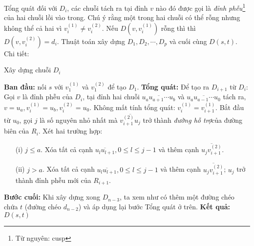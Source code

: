 Tổng quát đối với $D_i$, các chuỗi tách ra tại đỉnh $v$ nào đó được gọi là \textit{đỉnh phễu}\footnote{Từ nguyên: cusp} của hai chuỗi lồi vào trong. Chú ý rằng một trong hai chuỗi có thể rỗng nhưng không thể cả hai vì $v^{(1)}_i \ne v^{(2)}_i$. Nếu $D\left(v, v^{(1)}_i\right)$ rỗng thì thì $D\left(v,v^{(2)}_i\right) = d_i$.
\newpage
Thuật toán xây dựng $D_1,D_2,\cdots,D_p$ và cuối cùng $D\left(s,t\right)$. Chi tiết:

\begin{algorithm}
\caption{Xây dựng chuỗi $D_i$}
\begin{algorithmic}
    \STATE \textbf{Ban đầu:} nối $s$ với $v^{(1)}_1$ và $v^{(2)}_1$ để tạo $D_1$.
    \STATE \textbf{Tổng quát:} Để tạo ra $D_{i+1}$ từ $D_i$:
    \STATE Gọi $v$ là đỉnh phễu của $D_i$, tại đỉnh hai chuỗi $\overline{u_a u_{a+1} \cdots u_b}$ và $\overline{u_a u_{a-1} \cdots u_0}$ tách ra, $v = u_a, v^{(1)}_i = u_b, v^{(2)}_i = u_0$. Không mất tính tổng quát: $v^{(1)}_i = v^{(1)}_{i+1}$. Bắt đầu từ $u_0$, gọi $j$ là số nguyên nhỏ nhất mà $\overline{v^{(2)}_{i+1} u_j}$ trở thành \textit{đường hỗ trợ}\footnotemark của đường biên của $R_i$. Xét hai trường hợp:
    \begin{itemize}
        \item [(i)] $j \leq a$. Xóa tất cả cạnh $\overline{u_l u_{l+1}}, 0 \leq l \leq j -1$ và thêm cạnh $\overline{u_j v^{(2)}_{i+1}}$.
        \item [(ii)] $j > a$. Xóa tất cả cạnh $\overline{u_l u_{l+1}}, 0 \leq l \leq j -1$ và thêm cạnh $\overline{u_j v^{(2)}_{i+1}}$; $u_j$ trở thành đỉnh phễu mới của $R_{i+1}$.
    \end{itemize}

    \STATE \textbf{Bước cuối:} Khi xây dựng xong $D_{n-3}$, ta xem như có thêm một đường chéo chứa $t$ (đường chéo $d_{n-2}$) và áp dụng lại bước Tổng quát ở trên.
    \STATE \textbf{Kết quả:} $D\left(s,t\right)$
\end{algorithmic}
\end{algorithm}

